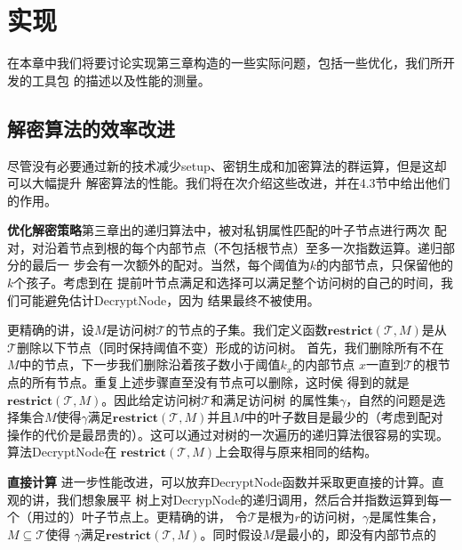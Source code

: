 \chapter{实现}
在本章中我们将要讨论实现第三章构造的一些实际问题，包括一些优化，我们所开发的工具包
的描述以及性能的测量。
\section{解密算法的效率改进}
尽管没有必要通过新的技术减少setup、密钥生成和加密算法的群运算，但是这却可以大幅提升
解密算法的性能。我们将在次介绍这些改进，并在4.3节中给出他们的作用。\par
\vspace{5mm}
\textbf{优化解密策略}\quad 第三章出的递归算法中，被对私钥属性匹配的叶子节点进行两次
配对，对沿着节点到根的每个内部节点（不包括根节点）至多一次指数运算。递归部分的最后一
步会有一次额外的配对。当然，每个阈值为$k$的内部节点，只保留他的$k$个孩子。考虑到在
提前叶节点满足和选择可以满足整个访问树的自己的时间，我们可能避免估计DecryptNode，因为
结果最终不被使用。\par
更精确的讲，设$M$是访问树$\mathcal{T}$的节点的子集。我们定义函数$\mathbf{restrict}(
\mathcal{T},M)$是从$\mathcal{T}$删除以下节点（同时保持阈值不变）形成的访问树。
首先，我们删除所有不在$M$中的节点，下一步我们删除沿着孩子数小于阈值$k_x$的内部节点
$x$一直到$\mathcal{T}$的根节点的所有节点。重复上述步骤直至没有节点可以删除，这时侯
得到的就是$\mathbf{restrict}(\mathcal{T},M)$。因此给定访问树$\mathcal{T}$和满足访问树
的属性集$\gamma$，自然的问题是选择集合$M$使得$\gamma$满足$\mathbf{restrict}(
\mathcal{T},M)$并且$M$中的叶子数目是最少的（考虑到配对操作的代价是最昂贵的）。这可以通过对树的一次遍历的递归算法很容易的实现。算法DecryptNode在
$\mathbf{restrict}(\mathcal{T},M)$上会取得与原来相同的结构。\par
\vspace{5mm}
\textbf{直接计算}\quad
进一步性能改进，可以放弃DecryptNode函数并采取更直接的计算。直观的讲，我们想象展平
树上对DecrypNode的递归调用，然后合并指数运算到每一个（用过的）叶子节点上。更精确的讲，
令$\mathcal{T}$是根为$r$的访问树，$\gamma$是属性集合，$M \subseteq \mathcal{T}$使得
$\gamma$满足$\mathbf{restrict}(\mathcal{T},M)$。同时假设$M$是最小的，即没有内部节点的
